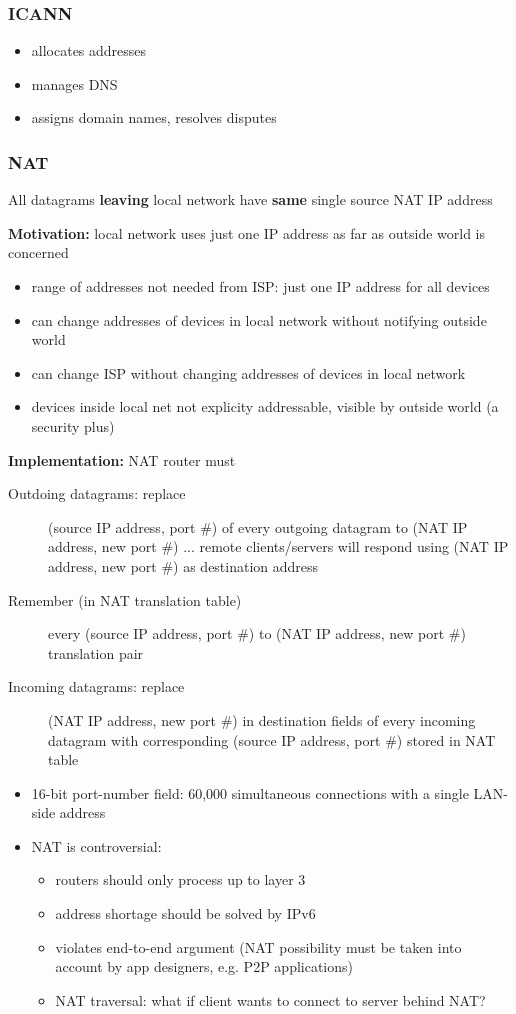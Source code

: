 \subsubsection{ICANN}\label{sec:icann}
\begin{itemize}
	\item allocates addresses
	\item manages DNS
	\item assigns domain names, resolves disputes
\end{itemize}
\subsubsection{NAT}\label{sec:nat}
All datagrams \textbf{leaving} local network have \textbf{same} single source NAT IP address
\begin{leftbar}
	\textbf{Motivation:} local network uses just one IP address as far as outside world is concerned
\end{leftbar}
\begin{itemize}
	\item range of addresses not needed from ISP: just one IP address for all devices
	\item can change addresses of devices in local network without notifying outside world
	\item can change ISP without changing addresses of devices in local network
	\item devices inside local net not explicity addressable, visible by outside world (a security plus)
\end{itemize}
\textbf{Implementation:} NAT router must
\begin{description}
	\item[Outdoing datagrams: replace] (source IP address, port \#) of every outgoing datagram to (NAT IP address, new port \#) ... remote clients/servers will respond using (NAT IP address, new port \#) as destination address
	\item[Remember (in NAT translation table)] every (source IP address, port \#) to (NAT IP address, new port \#) translation pair
	\item[Incoming datagrams: replace] (NAT IP address, new port \#) in destination fields of every incoming datagram with corresponding (source IP address, port \#) stored in NAT table
\end{description}
\begin{itemize}
	\item 16-bit port-number field: 60,000 simultaneous connections with a single LAN-side address
	\item NAT is controversial:
	\begin{itemize}
		\item routers should only process up to layer 3
		\item address shortage should be solved by IPv6
		\item violates end-to-end argument (NAT possibility must be taken into account by app designers, e.g. P2P applications)
		\item NAT traversal: what if client wants to connect to server behind NAT?
	\end{itemize}
\end{itemize}

